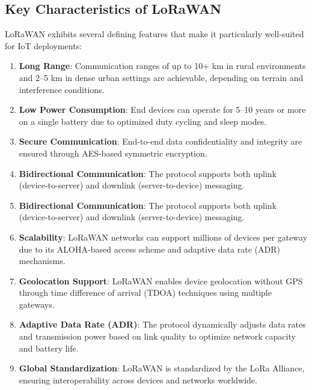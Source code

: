 \subsection{Key Characteristics of LoRaWAN}
LoRaWAN exhibits several defining features that make it particularly well-suited for IoT deployments:
\begin{enumerate}
    \item \textbf{Long Range}: Communication ranges of up to 10+ km in rural environments and 2–5 km in dense urban settings are achievable, depending on terrain and interference conditions.
    \item \textbf{Low Power Consumption}: End devices can operate for 5–10 years or more on a single battery due to optimized duty cycling and sleep modes.
    \item \textbf{Secure Communication}: End-to-end data confidentiality and integrity are ensured through AES-based symmetric encryption.\item \textbf{Bidirectional Communication}: The protocol supports both uplink (device-to-server) and downlink (server-to-device) messaging.
    \item \textbf{Bidirectional Communication}: The protocol supports both uplink (device-to-server) and downlink (server-to-device) messaging.
    \item \textbf{Scalability}: LoRaWAN networks can support millions of devices per gateway due to its ALOHA-based access scheme and adaptive data rate (ADR) mechanisms.
    \item \textbf{Geolocation Support}: LoRaWAN enables device geolocation without GPS through time difference of arrival (TDOA) techniques using multiple gateways.
    \item \textbf{Adaptive Data Rate (ADR)}: The protocol dynamically adjusts data rates and transmission power based on link quality to optimize network capacity and battery life.
    \item \textbf{Global Standardization}: LoRaWAN is standardized by the LoRa Alliance, ensuring interoperability across devices and networks worldwide.
\end{enumerate}

